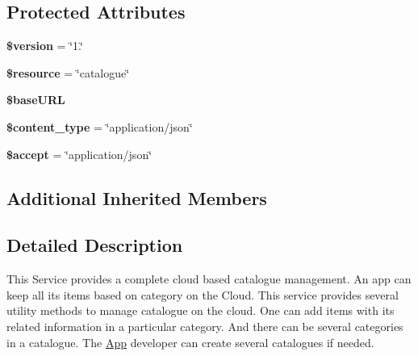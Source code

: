 \subsection*{Protected Attributes}
\begin{DoxyCompactItemize}
\item 
\hypertarget{class_catalogue_service_a17c8948c68aa44fa9961ae169b6a8961}{{\bfseries \$version} = \char`\"{}1.\char`\"{}}\label{class_catalogue_service_a17c8948c68aa44fa9961ae169b6a8961}

\item 
\hypertarget{class_catalogue_service_abd4c7b8b084214b8d2533ba07fce6b83}{{\bfseries \$resource} = \char`\"{}catalogue\char`\"{}}\label{class_catalogue_service_abd4c7b8b084214b8d2533ba07fce6b83}

\item 
\hypertarget{class_catalogue_service_ae91e634b1fa0ad6e2ee3928982cbda2a}{{\bfseries \$base\+U\+R\+L}}\label{class_catalogue_service_ae91e634b1fa0ad6e2ee3928982cbda2a}

\item 
\hypertarget{class_catalogue_service_ae754d6373f275e781f47c8bc9b994b6d}{{\bfseries \$content\+\_\+type} = \char`\"{}application/json\char`\"{}}\label{class_catalogue_service_ae754d6373f275e781f47c8bc9b994b6d}

\item 
\hypertarget{class_catalogue_service_a75fc18c4ff06288ff9fdf8aba9bd1081}{{\bfseries \$accept} = \char`\"{}application/json\char`\"{}}\label{class_catalogue_service_a75fc18c4ff06288ff9fdf8aba9bd1081}

\end{DoxyCompactItemize}
\subsection*{Additional Inherited Members}


\subsection{Detailed Description}
This Service provides a complete cloud based catalogue management. An app can keep all its items based on category on the Cloud. This service provides several utility methods to manage catalogue on the cloud. One can add items with its related information in a particular category. And there can be several categories in a catalogue. The \hyperlink{class_app}{App} developer can create several catalogues if needed.

